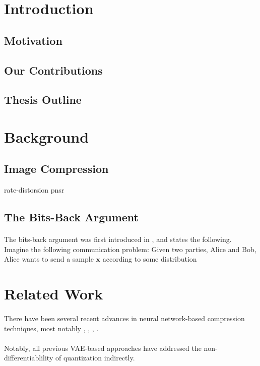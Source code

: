 \documentclass{article}
\renewcommand{\vec}[1]{\mathbf{#1}}
\begin{document}
\section{Introduction}
\subsection{Motivation}
\subsection{Our Contributions}
\subsection{Thesis Outline}
\paragraph{}

\section{Background}
\subsection{Image Compression}
rate-distorsion
pnsr
\cite{psnr}
\cite{msssim}
\subsection{The Bits-Back Argument}
\paragraph{}
The bits-back argument was first introduced in \cite{hinton1993keeping}, and states
the following. Imagine the following communication problem: Given two parties,
Alice and Bob, Alice wants to send a sample $\vec{x}$ according to some
distribution 

\section{Related Work}
\paragraph{}
There have been several recent advances in neural network-based compression
techniques, most notably \cite{balle2016end}, \cite{theis2017lossy},
\cite{rippel2017real}, \cite{balle2018variational}. 
\paragraph{}
Notably, all previous VAE-based approaches have addressed the
non-differentiablility of quantization indirectly.
\end{document}
